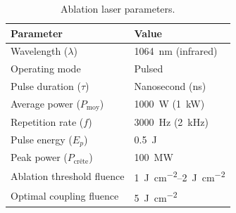 \begin{enumerate}
    \begin{table}[H]
      \centering
      \small
      \caption{Ablation laser parameters.}
      \label{tab:laser_ablation}
      \begin{tabular}{p{6cm} p{6cm}}
        \toprule
        \textbf{Parameter} & \textbf{Value} \\
        \midrule
        Wavelength ($\lambda$) & \SI{1064}{\nano\metre} (infrared) \\
        Operating mode & Pulsed \\
        Pulse duration ($\tau$) & Nanosecond (ns) \\
        Average power ($P_{\text{moy}}$) & \SI{1000}{\watt} (\SI{1}{\kilo\watt}) \\
        Repetition rate ($f$) & \SI{3000}{\hertz} (\SI{2}{\kilo\hertz}) \\
        Pulse energy ($E_p$) & \SI{0.5}{\joule} \\
        Peak power ($P_{\text{crête}}$) & \SI{100}{\mega\watt} \\
        Ablation threshold fluence & \SIrange{1}{2}{\joule\per\centi\metre\squared} \\
        Optimal coupling fluence & \SI{5}{\joule\per\centi\metre\squared} \\
        \bottomrule
      \end{tabular}
    \end{table}
\end{enumerate}


